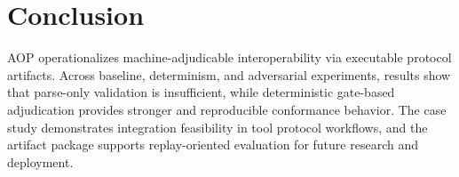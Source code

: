 \documentclass[10pt,conference]{IEEEtran}
\begin{document}
\section{Conclusion}

AOP operationalizes machine-adjudicable interoperability via executable
protocol artifacts. Across baseline, determinism, and adversarial experiments,
results show that parse-only validation is insufficient, while deterministic
gate-based adjudication provides stronger and reproducible conformance
behavior. The case study demonstrates integration feasibility in tool protocol
workflows, and the artifact package supports replay-oriented evaluation for
future research and deployment.



\end{document}

